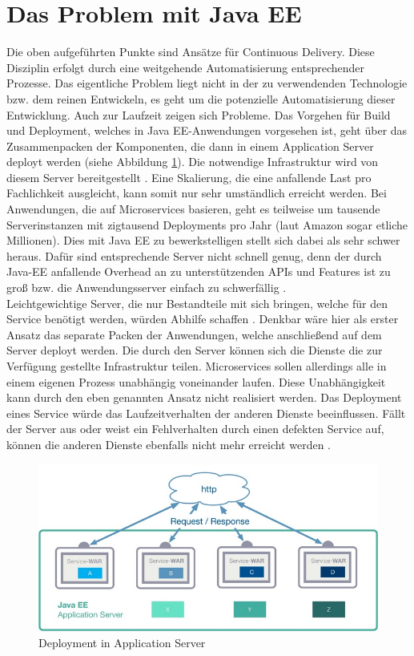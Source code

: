 \section{Das Problem mit Java EE}
Die oben aufgeführten Punkte sind Ansätze für Continuous Delivery. Diese Disziplin erfolgt durch eine weitgehende Automatisierung entsprechender Prozesse. Das eigentliche Problem liegt nicht in der zu verwendenden Technologie bzw. dem reinen Entwickeln, es geht um die potenzielle Automatisierung dieser Entwicklung. Auch zur Laufzeit zeigen sich Probleme. Das Vorgehen für Build und Deployment, welches in Java EE-Anwendungen vorgesehen ist, geht über das Zusammenpacken der Komponenten, die dann in einem Application Server deployt werden (siehe Abbildung \ref{fig:mp1}). Die notwendige Infrastruktur wird von diesem Server bereitgestellt \cite{LarsRowekamp.2017d}. Eine Skalierung, die eine anfallende Last pro Fachlichkeit ausgleicht, kann somit nur sehr umständlich erreicht werden. Bei Anwendungen, die auf Microservices basieren, geht es teilweise um tausende Serverinstanzen mit zigtausend Deployments pro Jahr (laut Amazon sogar etliche Millionen). Dies mit Java EE zu bewerkstelligen stellt sich dabei als sehr schwer heraus. Dafür sind entsprechende Server nicht schnell genug, denn der durch Java-EE anfallende Overhead an zu unterstützenden APIs und Features ist zu groß bzw. die Anwendungsserver einfach zu schwerfällig  \cite{jaxcenter.2016}. \\ 
Leichtgewichtige Server, die nur Bestandteile mit sich bringen, welche für den Service benötigt werden, würden Abhilfe schaffen \cite{jaxcenter.2016}. Denkbar wäre hier als erster Ansatz das separate Packen der Anwendungen, welche anschließend auf dem Server deployt werden. Die durch den Server können sich die Dienste die zur Verfügung gestellte Infrastruktur teilen. Microservices sollen allerdings alle in einem eigenen Prozess unabhängig voneinander laufen. Diese Unabhängigkeit kann durch den eben genannten Ansatz nicht realisiert werden. Das Deployment eines Service würde das Laufzeitverhalten der anderen Dienste beeinflussen. Fällt der Server aus oder weist ein Fehlverhalten durch einen defekten Service auf, können die anderen Dienste ebenfalls nicht mehr erreicht werden \cite{LarsRowekamp.2017d}.\\
\begin{figure}[h!]
	\centering
	\includegraphics[width=1.0\linewidth]{images/mp1}
	\caption{Deployment in Application Server \cite{LarsRowekamp.2017d}}
	\label{fig:mp1}
\end{figure}

